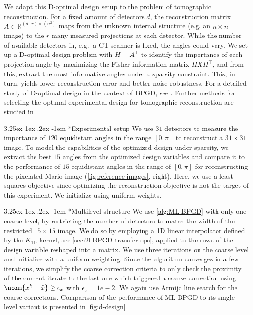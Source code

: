 \documentclass[11pt,reqno]{amsart}
\makeatletter
\numberwithin{equation}{section}
\numberwithin{figure}{section}
\theoremstyle{plain}
\theoremstyle{definition}
\newcommand{\R}{\mathbb{R}}
\renewcommand\paragraph{\@startsection{paragraph}{4}{0pt}%
  {3.25ex \@plus 1ex \@minus .2ex}%
  {-1em}
  {\normalfont\itshape}*}
\makeatother
\begin{document}
We adapt this D-optimal design setup to the problem of tomographic reconstruction. For a fixed amount of detectors $d$, the reconstruction matrix $A \in \R^{(d \cdot r) \times (n^2)}$ maps from the unknown internal structure (e.g. an $n \times n$ image) to the $r$ many measured projections at each detector. While the number of available detectors in, e.g., a CT scanner is fixed, the angles could vary. We set up a D-optimal design problem with $H = A^\top$ to identify the importance of each projection angle by maximizing the Fisher information matrix $HXH^\top$, and from this, extract the most informative angles under a sparsity constraint. This, in turn, yields lower reconstruction error and better noise robustness. For a detailed study of D-optimal design in the context of BPGD, see \cite{Lu2018}. Further methods for selecting the optimal experimental design for tomographic reconstruction are studied in \cite{Haldar2018,Fathi2025}

\paragraph{Experimental setup} We use $31$ detectors to measure the importance of $120$ equidistant angles in the range $[0, \pi]$ to reconstruct a $31 \times 31$ image. To model the capabilities of the optimized design under sparsity, we extract the best $15$ angles from the optimized design variables and compare it to the performance of $15$ equidistant angles in the range of $[0, \pi]$ for reconstructing the pixelated Mario image (\cref{fig:reference-images}, right). Here, we use a least-squares objective since optimizing the reconstruction objective is not the target of this experiment. We initialize using uniform weights.

\paragraph{Multilevel structure} We use \cref{alg:ML-BPGD} with only one coarse level, by restricting the number of detectors to match the width of the restricted $15 \times 15$ image.
We do so by employing a 1D linear interpolator defined by the $K_{1\text{D}}$ kernel, see \cref{sec:2l-BPGD-transfer-ops}, applied to the rows of the design variable reshaped into a matrix. We use three iterations on the coarse level and initialize with a uniform weighting. Since the algorithm converges in a few iterations, we simplify the coarse correction criteria to only check the proximity of the current iterate to the last one which triggered a coarse correction using $\norm{x^k - \tilde{x}} \geq \epsilon_x$ with $\epsilon_x = 1e-2$. We again use Armijo line search for the coarse corrections. Comparison of the performance of ML-BPGD to its single-level variant is presented in \cref{fig:d-design}.
\end{document}
